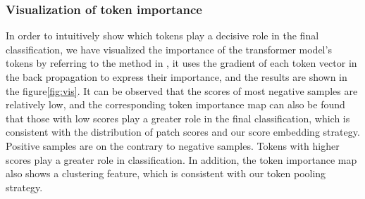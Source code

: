 \subsubsection{Visualization of token importance}
In order to intuitively show which tokens play a decisive role in the final classification, we have visualized the importance of the transformer model's tokens by referring to the method in \cite{abnar2020quantifying}, it uses the gradient of each token vector in the back propagation to express their importance, and the results are shown in the figure\ref{fig:vis}. It can be observed that the scores of most negative samples are relatively low, and the corresponding token importance map can also be found that those with low scores play a greater role in the final classification, which is consistent with the distribution of patch scores and our score embedding strategy. Positive samples are on the contrary to negative samples. Tokens with higher scores play a greater role in classification. In addition, the token importance map also shows a clustering feature, which is consistent with our token pooling strategy.
